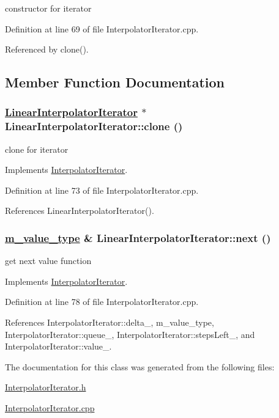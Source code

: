 constructor for iterator 



Definition at line 69 of file Interpolator\-Iterator.cpp.

Referenced by clone().

\subsection{Member Function Documentation}
\hypertarget{classLinearInterpolatorIterator_a1}{
\subsubsection[clone]{\setlength{\rightskip}{0pt plus 5cm}\hyperlink{classLinearInterpolatorIterator}{Linear\-Interpolator\-Iterator} $\ast$ Linear\-Interpolator\-Iterator::clone ()}}
\label{classLinearInterpolatorIterator_a1}


clone for iterator 



Implements \hyperlink{classInterpolatorIterator_a2}{Interpolator\-Iterator}.

Definition at line 73 of file Interpolator\-Iterator.cpp.

References Linear\-Interpolator\-Iterator().\hypertarget{classLinearInterpolatorIterator_a2}{
\subsubsection[next]{\setlength{\rightskip}{0pt plus 5cm}\hyperlink{Types_8h_a3}{m\_\-value\_\-type} \& Linear\-Interpolator\-Iterator::next ()}}
\label{classLinearInterpolatorIterator_a2}


get next value function 



Implements \hyperlink{classInterpolatorIterator_a4}{Interpolator\-Iterator}.

Definition at line 78 of file Interpolator\-Iterator.cpp.

References Interpolator\-Iterator::delta\_\-, m\_\-value\_\-type, Interpolator\-Iterator::queue\_\-, Interpolator\-Iterator::steps\-Left\_\-, and Interpolator\-Iterator::value\_\-.

The documentation for this class was generated from the following files:\begin{CompactItemize}
\item 
\hyperlink{InterpolatorIterator_8h}{Interpolator\-Iterator.h}\item 
\hyperlink{InterpolatorIterator_8cpp}{Interpolator\-Iterator.cpp}\end{CompactItemize}
